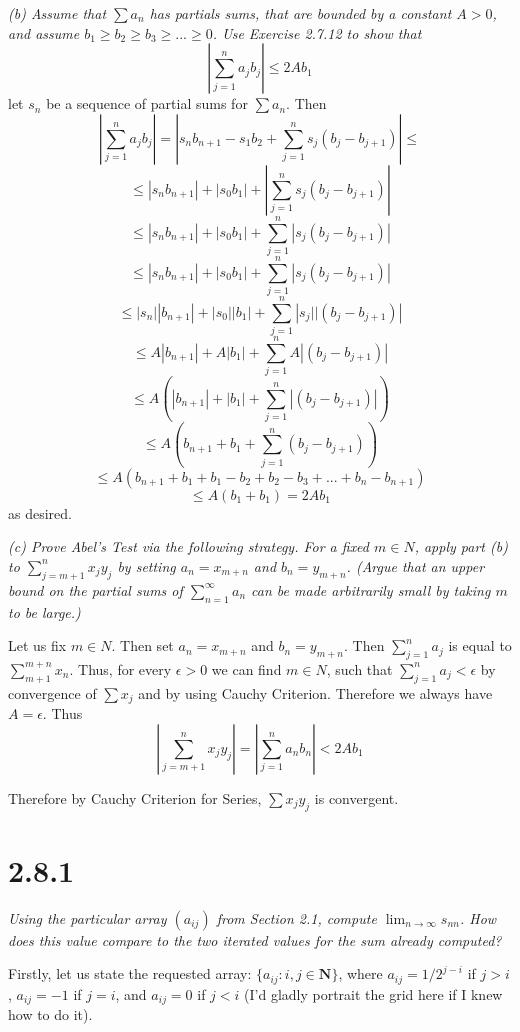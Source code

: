 \documentclass[11pt,oneside,titlepage]{book}
\begin{document}
\textit{(b) Assume that $\sum a_n$ has partials sums, that are bounded by a
  constant $A > 0$, and assume $b_1 \geq b_2 \geq b_3 \geq ... \geq 0$. Use
  Exercise 2.7.12 to show that }
$$\left|\sum_{j = 1}^{n} a_j b_j \right| \leq 2 A b_1$$
let $s_n$ be a sequence of partial sums for $\sum a_n$. Then
$$\left|\sum_{j = 1}^{n} a_j b_j \right| = \left|s_n b_{n + 1} - s_1 b_2 + \sum_{j = 1}^{n} s_j (b_j - b_{j + 1})\right| \leq $$
$$\leq |s_n b_{n + 1}| + |s_0 b_1| + \left|\sum_{j = 1}^{n} s_j (b_j - b_{j + 1})\right| $$
$$\leq |s_n b_{n + 1}| + |s_0 b_1| + \sum_{j = 1}^{n} \left|s_j (b_j - b_{j + 1})\right| $$
$$\leq |s_n b_{n + 1}| + |s_0 b_1| + \sum_{j = 1}^{n} \left|s_j (b_j - b_{j + 1})\right| $$
$$\leq |s_n ||b_{n + 1}| + |s_0 ||b_1| + \sum_{j = 1}^{n} \left|s_j|| (b_j - b_{j + 1})\right| $$
$$\leq A|b_{n + 1}| + A|b_1| + \sum_{j = 1}^{n} A \left| (b_j - b_{j + 1})\right| $$
$$\leq A(|b_{n + 1}| + |b_1| + \sum_{j = 1}^{n}  \left| (b_j - b_{j + 1})\right| )$$
$$\leq A(b_{n + 1} + b_1 + \sum_{j = 1}^{n}   (b_j - b_{j + 1}) )$$
$$\leq A(b_{n + 1} + b_1 + b_1 - b_2 + b_2 - b_3 + ... + b_n - b_{n + 1}) $$
$$\leq A(b_1 + b_1) = 2 A b_1 $$
as desired.

\textit{(c) Prove Abel's Test via the following strategy. For a fixed
  $m \in N$, apply part (b) to $\sum_{j = m + 1}^{n} x_j y_j $ by setting
  $a_n = x_{m + n}$ and $b_n = y_{m + n}$. (Argue that an upper bound on the
  partial sums of $\sum_{n = 1}^{\infty} a_n$ can be made arbitrarily small by
  taking $m$ to be large.)}

Let us fix $m \in N$. Then set $a_n = x_{m + n}$ and $b_n = y_{m + n}$. Then
$\sum_{j = 1}^{n} a_j$ is equal to $\sum_{m + 1}^{m + n} x_n$. Thus, for every
$\epsilon > 0$ we can find $m \in N$, such that
$\sum_{j = 1}^{n}a_j < \epsilon$ by convergence of $\sum x_j$ and by using
Cauchy Criterion. Therefore we always have $A = \epsilon$. Thus
$$|\sum_{j = m + 1}^{n} x_j y_j|= |\sum_{j = 1}^{n} a_n b_n| <2 A b_1$$

Therefore by Cauchy Criterion for Series, $\sum x_j y_j$ is convergent.

\section*{2.8.1}
\textit{Using the particular array $(a_{ij})$ from  Section 2.1, compute
  $\lim_{n \to \infty} s_{nn}$. How does this value compare to the two
  iterated values for the sum already computed? }

Firstly, let us state the requested array:  $\{a_{ij}: i,j \in \textbf{N}\}$,
where $a_{ij} = 1/2^{j - i}$ if $j > i$, $a_{ij} = -1$ if $j = i$, and
$a_{ij} = 0$ if $j < i$ (I'd gladly portrait the grid here if I knew how to
do it).
\end{document}
